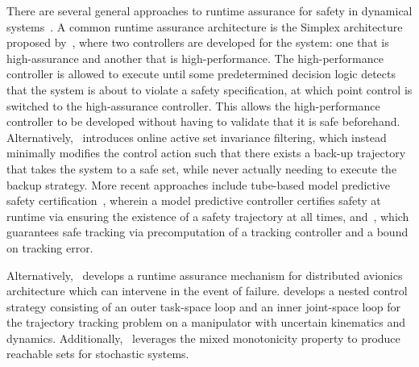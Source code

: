 \documentclass{IEEEojcsys}
\begin{document}
There are several general approaches to runtime assurance for safety in dynamical systems~\cite{cooganCSL2024}. 
A common runtime assurance architecture is the Simplex architecture proposed by~\cite{sha2001}, where two controllers are developed for the system: one that is high-assurance and another that is high-performance. The high-performance controller is allowed to execute until some predetermined decision logic detects that the system is about to violate a safety specification, at which point control is switched to the high-assurance controller. This allows the high-performance controller to be developed without having to validate that it is safe beforehand. Alternatively,~\cite{gurriet2018} introduces online active set invariance filtering, which instead minimally modifies the control action such that there exists a back-up trajectory that takes the system to a safe set, while never actually needing to execute the backup strategy.
More recent approaches include tube-based model predictive safety certification~\cite{wabersichLMPC}, wherein a model predictive controller certifies safety at runtime via ensuring the existence of a safety trajectory at all times, and~\cite{FaSTrack}, which guarantees safe tracking via precomputation of a tracking controller and a bound on tracking error.

Alternatively,~\cite{ghoriDist} develops a runtime assurance mechanism for distributed avionics architecture which can intervene in the event of failure. \cite{tarokhManip} develops a nested control strategy consisting of an outer task-space loop and an inner joint-space loop for the trajectory tracking problem on a manipulator with uncertain kinematics and dynamics. Additionally,~\cite{sivaramStochasticReach} leverages the mixed monotonicity property to produce reachable sets for stochastic systems.
\end{document}
